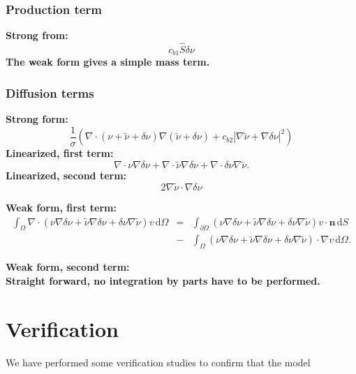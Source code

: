 \documentclass[twoside, 11pt, a4paper]{article}
\newcommand{\dee}{\mathrm{d}}
\begin{document}
\subsubsection*{Production term}
\bf Strong from:\rm
\begin{equation}
  c_{b1}\hat{S}\delta\nu
\end{equation}
The weak form gives a simple mass term.

\subsubsection*{Diffusion terms}
\bf Strong form:\rm
\begin{equation}
  \frac{1}{\sigma}\left(\nabla\cdot\left(\nu+\tilde{\nu}+\delta\nu\right)\nabla\left(\tilde{\nu}+\delta\nu\right)+c_{b2}\left|\nabla\tilde{\nu}+\nabla\delta\nu\right|^2\right)
\end{equation}
\bf Linearized, first term:\rm
\begin{equation}
  \nabla\cdot\nu\nabla\delta\nu + \nabla\cdot\tilde{\nu}\nabla\delta\nu + \nabla\cdot\delta\nu\nabla\tilde{\nu}.
\end{equation}
\bf Linearized, second term:\rm
\begin{equation}
  2\nabla\tilde{\nu}\cdot\nabla\delta\nu
\end{equation}

\bf Weak form, first term:\rm
\begin{equation}
  \begin{aligned}
    \int_\Omega \nabla \cdot \left(\nu\nabla\delta\nu + \tilde{\nu}\nabla\delta\nu + \delta\nu\nabla\tilde{\nu}\right)v\,\dee\Omega &=&
    \int_{\partial\Omega} \left(\nu\nabla\delta\nu + \tilde{\nu}\nabla\delta\nu + \delta\nu\nabla\tilde{\nu}\right)v\cdot \mathbf{n}\,\dee S \\
    &-&\int_\Omega \left(\nu\nabla\delta\nu + \tilde{\nu}\nabla\delta\nu + \delta\nu\nabla\tilde{\nu}\right)\cdot \nabla v\,\dee\Omega.
   \end{aligned}
\end{equation}

\bf Weak form, second term:\rm \\
Straight forward, no integration by parts have to be performed.
\newpage

\section{Verification}
We have performed some verification studies to confirm that the model 
\end{document}
